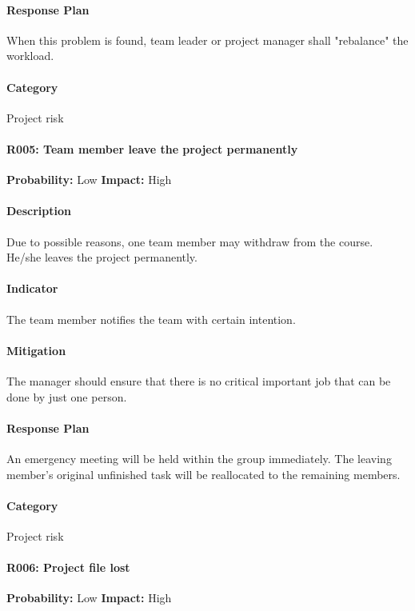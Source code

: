 \documentclass[11pt, a4paper]{report}
\begin{document}
	\paragraph{Response Plan}When this problem is found, team leader or project manager shall "rebalance" the workload. \\
	\paragraph{Category} Project risk
	
	\paragraph{R005: Team member leave the project permanently} \hspace{1cm} \textbf{Probability: }Low\hspace{1cm}   \textbf{Impact: }High
	\paragraph{Description}Due to possible reasons, one team member may withdraw from the course. He/she leaves the project permanently.
	\paragraph{Indicator}The team member notifies the team with certain intention.
	\paragraph{Mitigation}The manager should ensure that there is no critical important job that can be done by just one person.
	\paragraph{Response Plan}An emergency meeting will be held within the group immediately.  The leaving member's original unfinished task will be reallocated to the remaining members.\\
	\paragraph{Category} Project risk
	
	\paragraph{R006: Project file lost} \hspace{1cm} \textbf{Probability: }Low\hspace{1cm}   \textbf{Impact: }High
\end{document}
